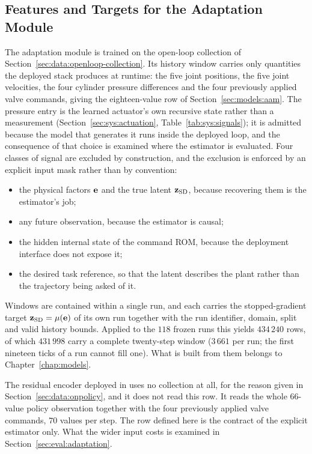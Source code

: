 \subsection{Features and Targets for the Adaptation Module}
\label{sec:data:history-features}

The adaptation module is trained on the open-loop collection of
Section~\ref{sec:data:openloop-collection}. Its history window carries only
quantities the deployed stack produces at runtime: the five joint positions, the
five joint velocities, the four cylinder pressure differences and the four
previously applied valve commands, giving the eighteen-value row of
Section~\ref{sec:models:aam}. The pressure entry is the learned actuator's own
recursive state rather than a measurement
(Section~\ref{sec:sys:actuation}, Table~\ref{tab:sys:signals}); it is admitted
because the model that generates it runs inside the deployed loop, and the
consequence of that choice is examined where the estimator is evaluated. Four
classes of signal are excluded by construction, and the exclusion is enforced by
an explicit input mask rather than by convention:

\begin{itemize}
  \item the physical factors $\mathbf{e}$ and the true latent $\mathbf{z}_{\mathrm{SD}}$,
    because recovering them is the estimator's job;
  \item any future observation, because the estimator is causal;
  \item the hidden internal state of the command ROM, because the
    deployment interface does not expose it;
  \item the desired task reference, so that the latent describes the
    plant rather than the trajectory being asked of it.
\end{itemize}

Windows are contained within a single run, and each carries the
stopped-gradient target $\mathbf{z}_{\mathrm{SD}} = \mu(\mathbf{e})$ of its own run together with
the run identifier, domain, split and valid history bounds. Applied to the $118$
frozen runs this yields $434\,240$ rows, of which $431\,998$ carry a complete
twenty-step window ($3\,661$ per run; the first nineteen ticks of a run cannot
fill one). What is built from them belongs to Chapter~\ref{chap:models}.

The residual encoder deployed in \ppoAAMFD{} uses no collection at all, for the
reason given in Section~\ref{sec:data:onpolicy}, and it does not read this row.
It reads the whole $66$-value policy observation together with the four
previously applied valve commands, $70$ values per step. The row defined here is
the contract of the explicit estimator only. What the wider input costs is
examined in Section~\ref{sec:eval:adaptation}.


